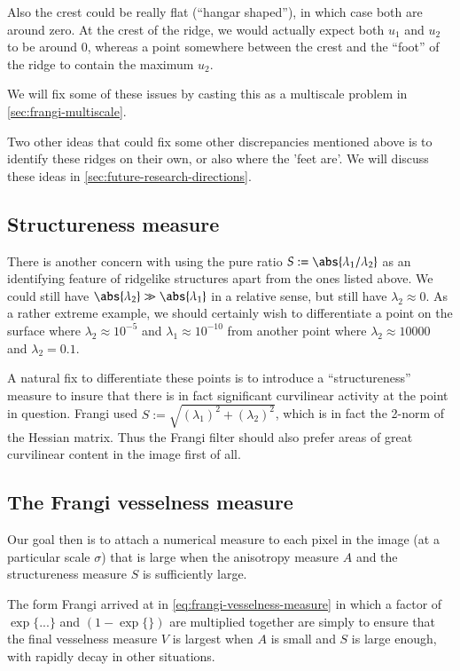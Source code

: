     Also the crest could be really flat (``hangar shaped''), in which case both are around zero. At the crest of the ridge, we would actually expect both $u_1$ and $u_2$ to be around 0, whereas a point somewhere between the crest and the ``foot'' of the ridge to contain the maximum $u_2$.
    
    We will fix some of these issues by casting this as a multiscale problem in \cref{sec:frangi-multiscale}.
    
    Two other ideas that could fix some other discrepancies mentioned above is to identify these ridges on their own, or also where the 'feet are'. We will discuss these ideas in \cref{sec:future-research-directions}.
    
    \subsection{Structureness measure} \label{sec:frangi-structureness}
    
    There is another concern with using the pure ratio $S:= \abs{\lambda_1 / \lambda_2}$ as an identifying feature of ridgelike structures apart from the ones listed above. We could still have $\abs{\lambda_2} \gg \abs{\lambda_1}$ in a relative sense, but still have $\lambda_2 \approx 0$. As a rather extreme example, we should certainly wish to differentiate a point on the surface where $\lambda_2 \approx 10^{-5} $ and $\lambda_1 \approx 10^{-10}$ from another point where $\lambda_2 \approx 10000$ and $\lambda_2 = 0.1$.
    
    A natural fix to differentiate these points is to introduce a ``structureness'' measure to insure that there is in fact significant curvilinear activity at the point in question. Frangi used $S:= \sqrt{(\lambda_1)^2 + (\lambda_2)^2}$, which is in fact the 2-norm of the Hessian matrix. Thus the Frangi filter should also prefer areas of
    great curvilinear content in the image first of all.
    
    
    \subsection{The Frangi vesselness measure}
    
    Our goal then is to attach a numerical measure to each pixel in the image (at a particular scale $\sigma$) that is large when the anisotropy measure $A$ and the structureness measure $S$ is sufficiently large.
    
    The form Frangi arrived at in \cref{eq:frangi-vesselness-measure} in which a factor of $\exp\{...\}$ and $(1 - \exp\{\})$ are multiplied together are simply to ensure that the final vesselness measure $V$ is largest when $A$ is small and $S$ is large enough, with rapidly decay in other situations.
    
